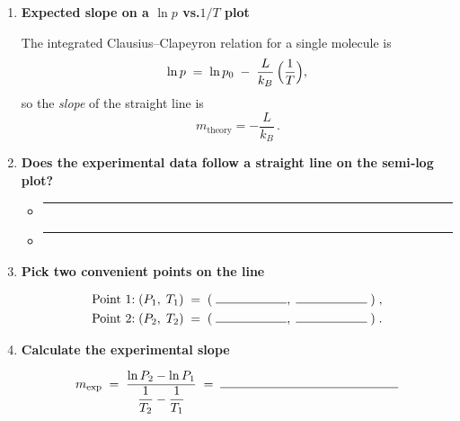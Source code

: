 \documentclass[12pt]{article}
\title{}
\author{Jerich Lee}
\date{\today}
\theoremstyle{definition} %
\theoremstyle{plain} %
\begin{document}
\maketitle

\begin{enumerate}
  \item \textbf{Expected slope on a \(\ln p\) vs.\(1/T\) plot}
  
  The integrated Clausius–Clapeyron relation for a single molecule is  
  \[
    \ln p \;=\; \ln p_0 \;-\; \frac{L}{k_B}\,\Bigl(\frac{1}{T}\Bigr),
  \]
  so the \emph{slope} of the straight line is
  \[
    \boxed{\,m_{\text{theory}} = -\dfrac{L}{k_B}\,}.
  \]
  
  \item \textbf{Does the experimental data follow a straight line on the
        semi‐log plot?}
  
  \begin{itemize}
    \item[] \rule{0.93\linewidth}{0.4pt}
    \item[] \rule{0.93\linewidth}{0.4pt}
  \end{itemize}
  
  \item \textbf{Pick two convenient points on the line}
  
  \[
    \begin{aligned}
      \text{Point 1:}\;& (P_1,\;T_1) \;=\;(\;\rule{2cm}{0.15mm},\;
                                           \rule{2cm}{0.15mm}\;)\;,\\
      \text{Point 2:}\;& (P_2,\;T_2) \;=\;(\;\rule{2cm}{0.15mm},\;
                                           \rule{2cm}{0.15mm}\;)\;.
    \end{aligned}
  \]
  
  \item \textbf{Calculate the experimental slope}
  
  \[
    m_{\text{exp}}
    \;=\;
    \frac{\ln P_2 - \ln P_1}{\dfrac{1}{T_2} - \dfrac{1}{T_1}}
    \;=\;
    \rule{5cm}{0.15mm}
  \]
  

\end{enumerate}
\end{document}
